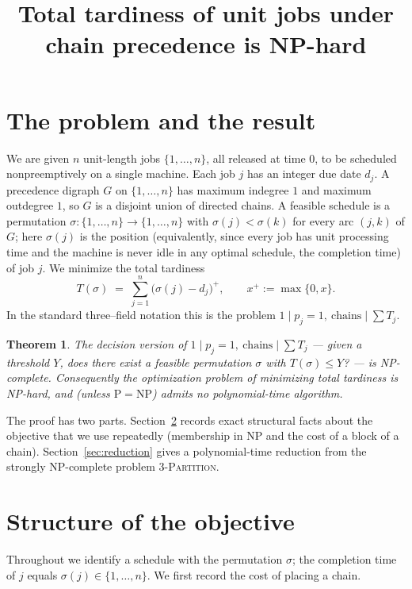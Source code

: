 \documentclass{amsart}
\newtheorem{theorem}{Theorem}
\theoremstyle{definition}
\theoremstyle{remark}
\begin{document}
\title{Total tardiness of unit jobs under chain precedence is NP-hard}
\maketitle

\section{The problem and the result}

We are given $n$ unit-length jobs $\{1,\dots,n\}$, all released at time $0$, to be
scheduled nonpreemptively on a single machine. Each job $j$ has an integer due date
$d_j$. A precedence digraph $G$ on $\{1,\dots,n\}$ has maximum indegree $1$ and maximum
outdegree $1$, so $G$ is a disjoint union of directed chains. A feasible schedule is a
permutation $\sigma:\{1,\dots,n\}\to\{1,\dots,n\}$ with $\sigma(j)<\sigma(k)$ for every
arc $(j,k)$ of $G$; here $\sigma(j)$ is the position (equivalently, since every job has
unit processing time and the machine is never idle in any optimal schedule, the
completion time) of job $j$. We minimize the total tardiness
\[
   T(\sigma)\;=\;\sum_{j=1}^{n}\bigl(\sigma(j)-d_j\bigr)^{+},
   \qquad x^{+}:=\max\{0,x\}.
\]
In the standard three–field notation this is the problem
$1\mid p_j=1,\ \mathrm{chains}\mid \sum T_j$.

\begin{theorem}\label{thm:main}
The decision version of $1\mid p_j=1,\ \mathrm{chains}\mid \sum T_j$ --- given a
threshold $Y$, does there exist a feasible permutation $\sigma$ with $T(\sigma)\le Y$? ---
is NP-complete. Consequently the optimization problem of minimizing total tardiness is
NP-hard, and (unless $\mathrm{P}=\mathrm{NP}$) admits no polynomial-time algorithm.
\end{theorem}

The proof has two parts. Section~\ref{sec:structure} records exact structural facts
about the objective that we use repeatedly (membership in NP and the cost of a block of a
chain). Section~\ref{sec:reduction} gives a polynomial-time reduction from the strongly
NP-complete problem \textsc{3-Partition}.

\section{Structure of the objective}\label{sec:structure}

Throughout we identify a schedule with the permutation $\sigma$; the completion time of
$j$ equals $\sigma(j)\in\{1,\dots,n\}$. We first record the cost of placing a chain.
\end{document}
